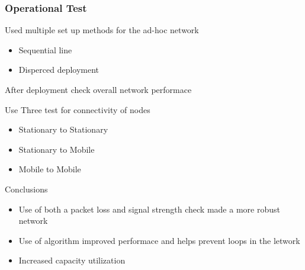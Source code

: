 \begin{frame}[t]
  \frametitle{Operational Test}

    Used multiple set up methods for the ad-hoc network
    \begin{itemize}
      \item Sequential line
      \item Disperced deployment
    \end{itemize}
    
    After deployment check overall network performace
    \item Use Three test for connectivity of nodes
      \begin{itemize}
        \item Stationary to Stationary
        \item Stationary to Mobile
        \item Mobile to Mobile
      \end{itemize}

  \vfill
  
  Conclusions
  \begin{itemize}
  \item Use of both a packet loss and signal strength check made a more robust
    network
  \item Use of algorithm improved performace and helps prevent loops in the
    letwork
  \item Increased capacity utilization
  \end{itemize}
  
  \vfill

  \begin{flushleft}
    \begin{tiny}
      \begin{minipage}{1.0\linewidth}
      \end{minipage}
    \end{tiny}
  \end{flushleft}
  
\end{frame}

